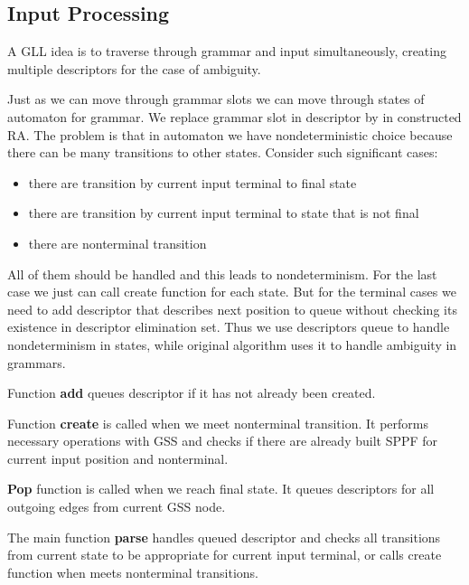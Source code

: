 \documentclass[runningheads,a4paper]{llncs}
\begin{document}
\subsection{Input Processing}%

A GLL idea is to traverse through grammar and input simultaneously, creating multiple descriptors for the case of ambiguity.

Just as we can move through grammar slots we can move through states of automaton for grammar.
We replace grammar slot in descriptor by in constructed RA.
The problem is that in automaton we have nondeterministic choice because there can be many transitions to other states.
Consider such significant cases:

\begin{itemize} 
\item there are transition by current input terminal to final state
\item there are transition by current input terminal to state that is not final
\item there are nonterminal transition
\end{itemize}

All of them should be handled and this leads to nondeterminism. 
For the last case we just can call create function for each state.
But for the terminal cases we need to add descriptor that describes next position to queue without checking its existence in descriptor elimination set.
Thus we use descriptors queue to handle nondeterminism in states, while original algorithm uses it to handle ambiguity in grammars.

%

Function \textbf{add} queues descriptor if it has not already been created.



Function \textbf{create} is called when we meet nonterminal transition.
It performs necessary operations with GSS and checks if there are already built SPPF for current
input position and nonterminal.



\textbf{Pop} function is called when we reach final state. It queues descriptors for all outgoing edges from current GSS node.



The main function \textbf{parse} handles queued descriptor and checks all transitions from current state to be appropriate
for current input terminal, or calls create function when meets nonterminal transitions.
\end{document}
